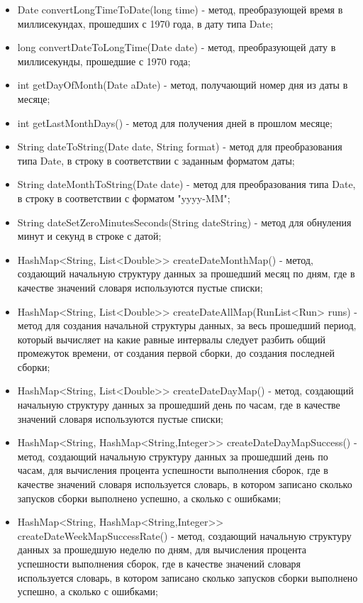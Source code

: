 \begin{itemize}
	\item Date convertLongTimeToDate(long time) - метод, преобразующей время в миллисекундах, прошедших с 1970 года, в дату типа Date;
	\item long convertDateToLongTime(Date date) - метод, преобразующей дату в миллисекунды, прошедшие с 1970 года;
	\item int getDayOfMonth(Date aDate) - метод, получающий номер дня из даты в месяце;
	\item int getLastMonthDays() - метод для получения дней в прошлом месяце;
	\item String dateToString(Date date, String format) - метод для преобразования типа Date, в строку в соответствии с заданным форматом даты;
	\item String dateMonthToString(Date date) - метод для преобразования типа Date, в строку в соответствии с форматом "yyyy-MM";
	\item String dateSetZeroMinutesSeconds(String dateString) - метод для обнуления минут и секунд в строке с датой;
	\item HashMap<String, List<Double>> createDateMonthMap() - метод, создающий начальную структуру данных за прошедший месяц по дням, где в качестве значений словаря используются пустые списки;
	\item HashMap<String, List<Double>> createDateAllMap(RunList<Run> runs) - метод для создания начальной структуры данных, за весь прошедший период, который вычисляет на какие равные интервалы следует разбить общий промежуток времени, от создания первой сборки, до создания последней сборки;
	\item HashMap<String, List<Double>> createDateDayMap() - метод, создающий начальную структуру данных за прошедший день по часам, где в качестве значений словаря используются пустые списки;
	\item HashMap<String, HashMap<String,Integer>> createDateDayMapSuccess() - метод, создающий начальную структуру данных за прошедший день по часам, для вычисления процента успешности выполнения сборок, где в качестве значений словаря используется словарь, в котором записано сколько запусков сборки выполнено успешно, а сколько с ошибками;
	\item HashMap<String, HashMap<String,Integer>> createDateWeekMapSuccessRate() - метод, создающий начальную структуру данных за прошедшую неделю по дням, для вычисления процента успешности выполнения сборок, где в качестве значений словаря используется словарь, в котором записано сколько запусков сборки выполнено успешно, а сколько с ошибками;

\end{itemize}
